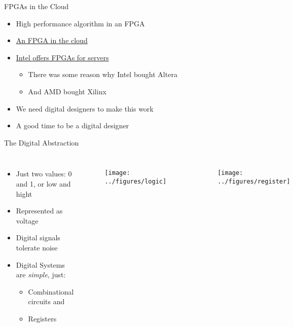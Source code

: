 \begin{frame}[fragile]{FPGAs in the Cloud}
\begin{itemize}
\item High performance algorithm in an FPGA
\item \href{https://aws.amazon.com/ec2/instance-types/f1/}{An FPGA in the cloud}
\item \href{https://www.intel.com/content/www/us/en/products/docs/storage/programmable/applications/cloud.html}{Intel offers FPGAs for servers}
\begin{itemize}
\item There was some reason why Intel bought Altera
\item And AMD bought Xilinx
\end{itemize}
\item We need digital designers to make this work
\item A good time to be a digital designer
\end{itemize}
\end{frame}

\begin{frame}[fragile]{The Digital Abstraction}
\begin{columns}
 
\begin{itemize}
\item Just two values: 0 and 1, or low and hight
\item Represented as voltage
\item Digital signals tolerate noise
\item Digital Systems are \emph{simple}, just:
\begin{itemize}
\item Combinational circuits and
\item Registers
\end{itemize}
\end{itemize}
 
\begin{figure}
  \texttt{[image: ../figures/logic]}
\end{figure}
\begin{figure}
  \texttt{[image: ../figures/register]}
\end{figure}
\end{columns}

\end{frame}

